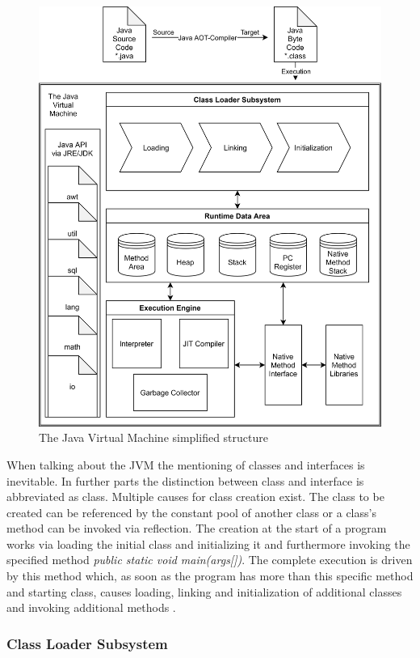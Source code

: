 \begin{figure}[h]
    \centering
	\includegraphics[scale=0.8]{figures/JVM.png}
	\caption{The Java Virtual Machine simplified structure}
	\label{fig:jvm}
\end{figure}

When talking about the JVM the mentioning of classes and interfaces is inevitable.
In further parts the distinction between class and interface is abbreviated as class.
Multiple causes for class creation exist. The class to be created can be referenced by the constant pool of another class or a class's method can be invoked via reflection.
The creation at the start of a program works via loading the initial class and initializing it and furthermore invoking the specified method \emph{public static void main(args[])}. The complete execution is driven by this method which, as soon as the program has more than this specific method and starting class, causes loading, linking and initialization of additional classes and invoking additional methods \cite{Lindholm}.

\subsubsection{Class Loader Subsystem}

